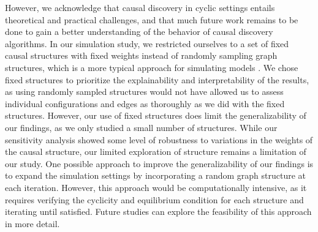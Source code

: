 \documentclass[twoside, 11pt]{article}
\begin{document}
However, we acknowledge that causal discovery in cyclic settings entails theoretical and practical challenges, and that much future work remains to be done to gain a better understanding of the behavior of causal discovery algorithms.
In our simulation study, we restricted ourselves to a set of fixed causal structures with fixed weights instead of randomly sampling graph structures, which is a more typical approach for simulating models \citep{mooij_joint_2020, strobl2019, diego2012}. We chose fixed structures to prioritize the explainability and interpretability of the results, as using randomly sampled structures would not have allowed us to assess individual configurations and edges as thoroughly as we did with the fixed structures.
However, our use of fixed structures does limit the generalizability of our findings, as we only studied a small number of structures. While our sensitivity analysis showed some level of robustness to variations in the weights of the causal structure, our limited exploration of structure remains a limitation of our study. 
One possible approach to improve the generalizability of our findings is to expand the simulation settings by incorporating a random graph structure at each iteration. However, this approach would be computationally intensive, as it requires verifying the cyclicity and equilibrium condition for each structure and iterating until satisfied. Future studies can explore the feasibility of this approach in more detail.
\end{document}
